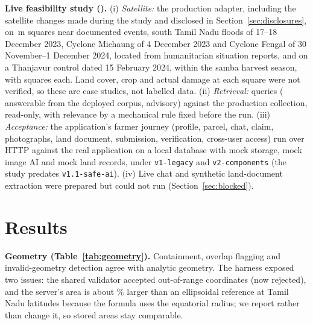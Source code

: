 \documentclass[journal]{IEEEtran}
\begin{document}
\textbf{Live feasibility study (\StudyDate{}).} (i) \emph{Satellite:} the production adapter, including the satellite changes made during the study and disclosed in Section~\ref{sec:disclosures}, on \SatSquareSideMetres\,m squares near \SatEventCountWord{} documented events, south Tamil Nadu floods of 17--18 December 2023, Cyclone Michaung of 4 December 2023 and Cyclone Fengal of 30 November--1 December 2024, located from humanitarian situation reports, and on a Thanjavur control dated 15 February 2024, within the samba harvest season, with \SatSquaresPerEventWord{} squares each. Land cover, crop and actual damage at each square were not verified, so these are case studies, not labelled data. (ii) \emph{Retrieval:} \RagQueries{} queries (\RagAnswerableQueries{} answerable from the deployed corpus, \RagAdvisoryQueries{} advisory) against the production collection, read-only, with relevance by a mechanical rule fixed before the run. (iii) \emph{Acceptance:} the application's farmer journey (profile, parcel, chat, claim, photographs, land document, submission, verification, cross-user access) run over HTTP against the real application on a local database with mock storage, mock image AI and mock land records, under \texttt{v1-legacy} and \texttt{v2-components} (the study predates \texttt{v1.1-safe-ai}). (iv) Live chat and synthetic land-document extraction were prepared but could not run (Section~\ref{sec:blocked}).

\section{Results}


\textbf{Geometry (Table~\ref{tab:geometry}).} Containment, overlap flagging and invalid-geometry detection agree with analytic geometry. The harness exposed two issues: the shared validator accepted out-of-range coordinates (now rejected), and the server's area is about \GeometryAreaBiasPercent\% larger than an ellipsoidal reference at Tamil Nadu latitudes because the formula uses the equatorial radius; we report rather than change it, so stored areas stay comparable.
\end{document}
